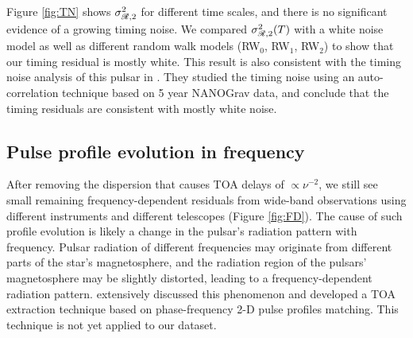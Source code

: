 {Figure \ref{fig:TN} shows $\sigma^2_{\mathscr{R},2}$ for different time scales, and
there is no significant evidence of a growing timing noise. We compared 
$\sigma^2_{\mathscr{R},2}(T)$ with a white noise model as well as different random
walk models (RW$_0$, RW$_1$, RW$_2$) to show that our timing residual is
mostly white.
This result is also consistent with the timing noise analysis of this pulsar in 
\citet{pjl+13}. They studied the timing noise using an auto-correlation technique
based on 5 year NANOGrav data, and conclude that the timing residuals are
consistent with mostly white noise.
}



\subsection{Pulse profile evolution in frequency}
\label{sec:FD}
After removing the dispersion that causes TOA delays of $\propto \nu^{-2}$,
 we still see small remaining frequency-dependent residuals from wide-band
observations using
different instruments and different telescopes (Figure \ref{fig:FD}).  
The cause of such profile evolution is likely a change in the pulsar's
radiation pattern with frequency.  Pulsar radiation of different frequencies may originate from
different parts of the star's magnetosphere, and 
the radiation region of the pulsars' magnetosphere may be slightly distorted,
leading to a frequency-dependent radiation pattern. \citet{pdr14} 
extensively discussed this phenomenon and developed a TOA extraction technique
based on phase-frequency 2-D pulse profiles matching. This technique is not
yet applied to our dataset.

